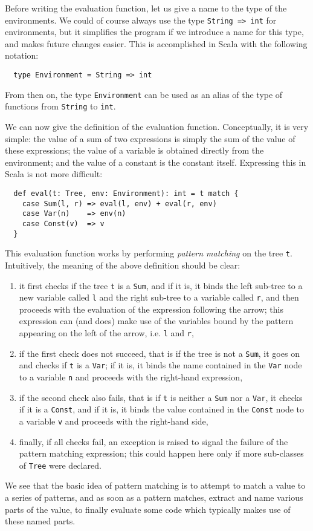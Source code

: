 \documentclass[a4paper,12pt,twoside,titlepage]{article}
\begin{document}
Before writing the evaluation function, let us give a name to the type
of the environments. We could of course always use the type
\lstinline?String => int? for environments, but it simplifies the program
if we introduce a name for this type, and makes future changes easier.
This is accomplished in Scala with the following notation:
\begin{lstlisting}
  type Environment = String => int
\end{lstlisting}
From then on, the type \lstinline?Environment? can be used as an alias of
the type of functions from \lstinline?String? to \lstinline?int?.

We can now give the definition of the evaluation function.
Conceptually, it is very simple: the value of a sum of two expressions
is simply the sum of the value of these expressions; the value of a
variable is obtained directly from the environment; and the value of a
constant is the constant itself. Expressing this in Scala is not more
difficult:
\begin{lstlisting}
  def eval(t: Tree, env: Environment): int = t match {
    case Sum(l, r) => eval(l, env) + eval(r, env)
    case Var(n)    => env(n)
    case Const(v)  => v
  }
\end{lstlisting}
This evaluation function works by performing \emph{pattern matching}
on the tree \lstinline?t?. Intuitively, the meaning of the above definition
should be clear:
\begin{enumerate}
\item it first checks if the tree \lstinline?t? is a \lstinline?Sum?, and if it
  is, it binds the left sub-tree to a new variable called \lstinline?l? and
  the right sub-tree to a variable called \lstinline?r?, and then proceeds
  with the evaluation of the expression following the arrow; this
  expression can (and does) make use of the variables bound by the
  pattern appearing on the left of the arrow, i.e. \lstinline?l? and
  \lstinline?r?,
\item if the first check does not succeed, that is if the tree is not
  a \lstinline?Sum?, it goes on and checks if \lstinline?t? is a \lstinline?Var?; if
  it is, it binds the name contained in the \lstinline?Var? node to a
  variable \lstinline?n? and proceeds with the right-hand expression,
\item if the second check also fails, that is if \lstinline?t? is neither a
  \lstinline?Sum? nor a \lstinline?Var?, it checks if it is a \lstinline?Const?, and
  if it is, it binds the value contained in the \lstinline?Const? node to a
  variable \lstinline?v? and proceeds with the right-hand side,
\item finally, if all checks fail, an exception is raised to signal
  the failure of the pattern matching expression; this could happen
  here only if more sub-classes of \lstinline?Tree? were declared.
\end{enumerate}
We see that the basic idea of pattern matching is to attempt to match
a value to a series of patterns, and as soon as a pattern matches,
extract and name various parts of the value, to finally evaluate some
code which typically makes use of these named parts.
\end{document}
